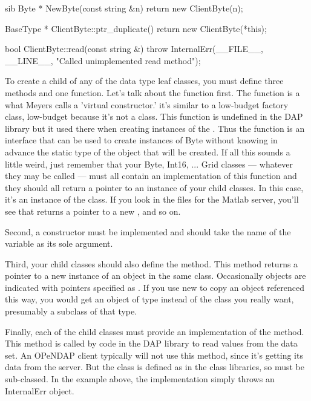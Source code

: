 \documentclass{dods-paper}
\begin{document}
\begin{vcode}{sib}
Byte *
NewByte(const string &n)
{
    return new ClientByte(n);
}

BaseType *
ClientByte::ptr_duplicate()
{
    return new ClientByte(*this);
}

bool
ClientByte::read(const string &)
{
  throw InternalErr(__FILE__, __LINE__, "Called unimplemented read method");
}
\end{vcode}

To create a child of any of the data type leaf classes, you must
define three methods and one function. Let's talk about the function
first. The function  is a what Meyers calls a 'virtual
constructor.'  it's similar to a low-budget factory class, low-budget
because it's not a class. This function is undefined in the DAP
library but it used there when creating instances of the .
Thus the function  is an interface that can be used to
create instances of Byte without knowing in advance the static type of
the object that will be created. If all this sounds a little weird,
just remember that your Byte, Int16, ... Grid classes --- whatever
they may be called --- must all contain an implementation of this
function and they should all return a pointer to an instance of your
child classes. In this case, it's an instance of the  class.
If you look in the files for the Matlab server, you'll see that 
returns a pointer to a new , and so on.

Second, a constructor must be implemented and should take the name of the
variable as its sole argument.


Third, your child classes should also define the
 method.  This method returns a pointer to a new
instance of an object in the same class.  Occasionally objects are
indicated with pointers specified as .  If you use new
to copy an object referenced this way, you would get an object of type
 instead of the class you really want, presumably a
subclass of that type.


Finally, each of the child classes must provide an implementation of
the  method. This method is called by code in the DAP
library to read values from the data set.  An OPeNDAP client typically
will not use this method, since it's getting its data from the
server.  But the class is defined as  in the class
libraries, so must be sub-classed.  In the example above, the
implementation simply throws an InternalErr object.
\end{document}

